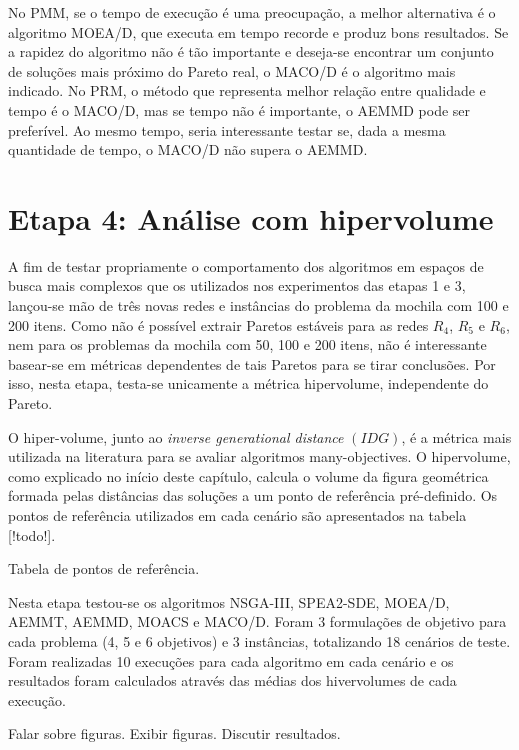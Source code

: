 No PMM, se o tempo de execução é uma preocupação, a melhor alternativa é o algoritmo MOEA/D, que executa em tempo recorde e produz bons resultados. Se a rapidez do algoritmo não é tão importante e deseja-se encontrar um conjunto de soluções mais próximo do Pareto real, o MACO/D é o algoritmo mais indicado. No PRM, o método que representa melhor relação entre qualidade e tempo é o MACO/D, mas se tempo não é importante, o AEMMD pode ser preferível. Ao mesmo tempo, seria interessante testar se, dada a mesma quantidade de tempo, o MACO/D não supera o AEMMD.

\section{Etapa 4: Análise com hipervolume}
\label{section_experiments_3}

A fim de testar propriamente o comportamento dos algoritmos em espaços de busca mais complexos que os utilizados nos experimentos das etapas 1 e 3, lançou-se mão de três novas redes e instâncias do problema da mochila com 100 e 200 itens. Como não é possível extrair Paretos estáveis para as redes $R_4$, $R_5$ e $R_6$, nem para os problemas da mochila com 50, 100 e 200 itens, não é interessante basear-se em métricas dependentes de tais Paretos para se tirar conclusões. Por isso, nesta etapa, testa-se unicamente a métrica hipervolume, independente do Pareto.

O hiper-volume, junto ao \textit{inverse generational distance} $(IDG)$, é a métrica mais utilizada na literatura para se avaliar algoritmos many-objectives. O hipervolume, como explicado no início deste capítulo, calcula o volume da figura geométrica formada pelas distâncias das soluções a um ponto de referência pré-definido. Os pontos de referência utilizados em cada cenário são apresentados na tabela [!todo!].

Tabela de pontos de referência.

Nesta etapa testou-se os algoritmos NSGA-III, SPEA2-SDE, MOEA/D, AEMMT, AEMMD, MOACS e MACO/D. Foram 3 formulações de objetivo para cada problema (4, 5 e 6 objetivos) e 3 instâncias, totalizando 18 cenários de teste. Foram realizadas 10 execuções para cada algoritmo em cada cenário e os resultados foram calculados através das médias dos hivervolumes de cada execução.

Falar sobre figuras.
Exibir figuras.
Discutir resultados.